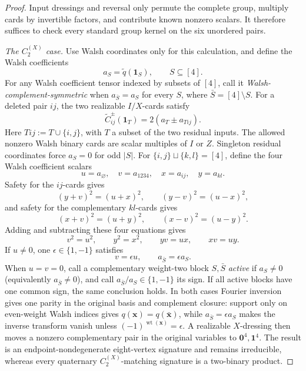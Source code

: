 \documentclass[11pt,letterpaper,onecolumn]{article}
\theoremstyle{plain}
\theoremstyle{definition}
\theoremstyle{remark}
\newcommand{\CycX}[1]{{C_{#1}^{(X)}}}
\newcommand{\wt}{\operatorname{wt}}
\newcommand{\one}{\mathbf 1}
\newcommand{\zero}{\mathbf 0}
\begin{document}
\begin{proof}
Input dressings and reversal only permute the complete group, multiply cards
by invertible factors, and contribute known nonzero scalars.  It therefore
suffices to check every standard group kernel on the six unordered pairs.

\emph{The \(\CycX{2}\) case.}
Use Walsh coordinates only for this calculation, and define the Walsh
coefficients
\[
 a_S=\widetilde q(\one_S),\qquad S\subseteq[4].
\]
For any Walsh coefficient tensor indexed by subsets of \([4]\), call it
\emph{Walsh-complement-symmetric} when
\(a_{\bar S}=a_S\) for every \(S\), where
\(\bar S=[4]\setminus S\).
For a deleted pair \(ij\), the two realizable \(I/X\)-cards satisfy
\begin{equation*}
 \widetilde C_{ij}^{\pm}(\one_T)
 =2(a_T\pm a_{Tij}).
\end{equation*}
Here \(Tij:=T\cup\{i,j\}\), with \(T\) a subset of the two residual inputs.
The allowed nonzero Walsh binary cards are scalar multiples of \(I\) or \(Z\).  Singleton residual coordinates force
\(a_S=0\) for odd \(|S|\).  For
\(\{i,j\}\sqcup\{k,l\}=[4]\), define the four Walsh coefficient scalars
\[
 u=a_\varnothing,\quad v=a_{1234},\quad
 x=a_{ij},\quad y=a_{kl}.
\]
Safety for the \(ij\)-cards gives
\[
 (y+v)^2=(u+x)^2,\qquad (y-v)^2=(u-x)^2,
\]
and safety for the complementary \(kl\)-cards gives
\[
 (x+v)^2=(u+y)^2,\qquad (x-v)^2=(u-y)^2.
\]
Adding and subtracting these four equations gives
\begin{equation*}
 v^2=u^2,\qquad y^2=x^2,\qquad
 yv=ux,\qquad xv=uy.
\end{equation*}
If \(u\ne0\), one \(\epsilon\in\{1,-1\}\) satisfies
\[
 v=\epsilon u,\qquad a_{\bar S}=\epsilon a_S.
\]
When \(u=v=0\), call a complementary weight-two block \(S,\bar S\)
\emph{active} if \(a_S\ne0\) (equivalently \(a_{\bar S}\ne0\)), and call
\(a_{\bar S}/a_S\in\{1,-1\}\) its sign.  If all active blocks have one
common sign, the same conclusion holds.  In both cases Fourier inversion
gives one parity in the original basis and complement closure: support only on even-weight
Walsh indices gives \(q({\mathbf{x}})=q(\bar {\mathbf{x}})\), while
\(a_{\bar S}=\epsilon a_S\) makes the inverse transform vanish unless
\((-1)^{\wt({\mathbf{x}})}=\epsilon\).  A realizable \(X\)-dressing then moves a nonzero
complementary pair in the original variables to \(\zero^4,\one^4\).  The result is an
endpoint-nondegenerate eight-vertex signature and remains irreducible,
whereas every quaternary \(\CycX{2}\)-matching signature is a two-binary product.


\end{proof}
\end{document}
